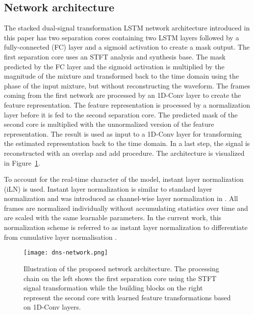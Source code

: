 \documentclass[a4paper]{article}
\begin{document}
\subsection{Network architecture}
The stacked dual-signal transformation LSTM network architecture introduced in this paper has two separation cores containing two LSTM layers followed by a fully-connected (FC) layer and a sigmoid activation to create a mask output. 
The first separation core uses an STFT analysis and synthesis base. 
The mask predicted by the FC layer and the sigmoid activation is multiplied by the magnitude of the mixture and transformed back to the time domain using the phase of the input mixture, but without reconstructing the waveform. 
The frames coming from the first network are processed by an 1D-Conv layer to create the feature representation. The feature representation is processed by a normalization layer before it is fed to the second separation core. 
The predicted mask of the second core is multiplied with the unnormalized version of the feature representation. The result is used as input to a 1D-Conv layer for transforming the estimated representation back to the time domain. In a last step, the signal is reconstructed with an overlap and add procedure. The architecture is visualized in Figure~\ref{fig:dns-network}.

To account for the real-time character of the model, instant layer normalization (iLN) is used. 
Instant layer normalization is similar to standard layer normalization \cite{ba2016layer} and was introduced as channel-wise layer normalization in \cite{luo2018conv2}. All frames are normalized individually without accumulating statistics over time and are scaled with the same learnable parameters. 
In the current work, this normalization scheme is referred to as instant layer normalization to differentiate from cumulative layer normalisation \cite{luo2019conv}.
\begin{figure}[t]
  \centering
  \texttt{[image: dns-network.png]}
  \caption{Illustration of the proposed network architecture. The processing chain on the left shows the first separation core using the STFT signal transformation while the building blocks on the right represent the second core with learned feature transformations based on 1D-Conv layers.}
\label{fig:dns-network}
\end{figure}
\end{document}
